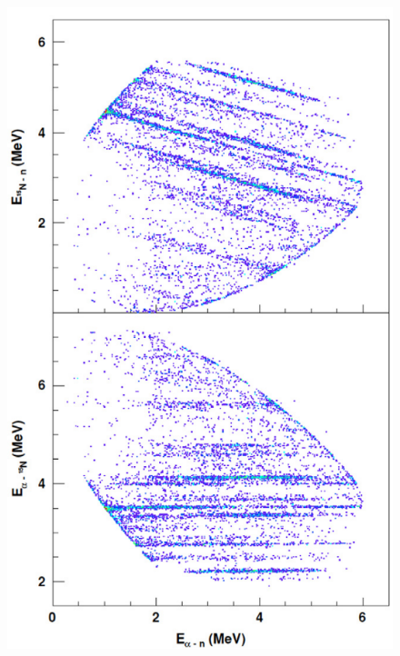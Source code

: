 \begin{enumerate}
\begin{figure}[h]
		\includegraphics[scale=0.5]{Immagini/0421_eng.png}

\end{figure}
\end{enumerate}
